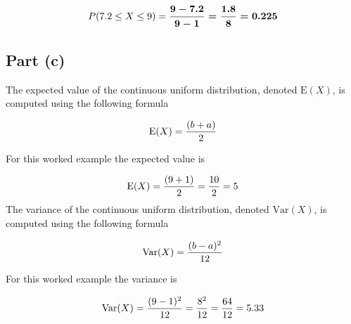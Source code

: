 \documentclass[a4paper,12pt]{article}
\begin{document}
\[
P( 7.2 \leq X \leq 9 ) = \boldsymbol{{ 9 - 7.2 \over 9 - 1} = { 1.8 \over 8} = 0.225}
\]

\subsection*{Part (c)}
The expected value of the continuous uniform distribution, denoted $\textrm{E}(X)$,  is  computed using the following formula

\vspace{0.1cm}

\[
\textrm{E}(X) = {(b + a) \over 2}
\]

\vspace{0.1cm}

For this worked example the expected value is

\[
\textrm{E}(X) = {(9 + 1) \over 2} =  {10 \over 2} = 5
\]
The variance of the continuous uniform distribution, denoted $\textrm{Var}(X)$,  is  computed using the following formula

\vspace{0.1cm}

\[
\textrm{Var}(X) = {(b - a)^2 \over 12}
\]

\vspace{0.1cm}

For this worked example the variance is

\[
\textrm{Var}(X) = {(9 - 1)^2 \over 12} =  {8^2 \over 12} = {64 \over 12} = 5.33
\]
\end{document}
